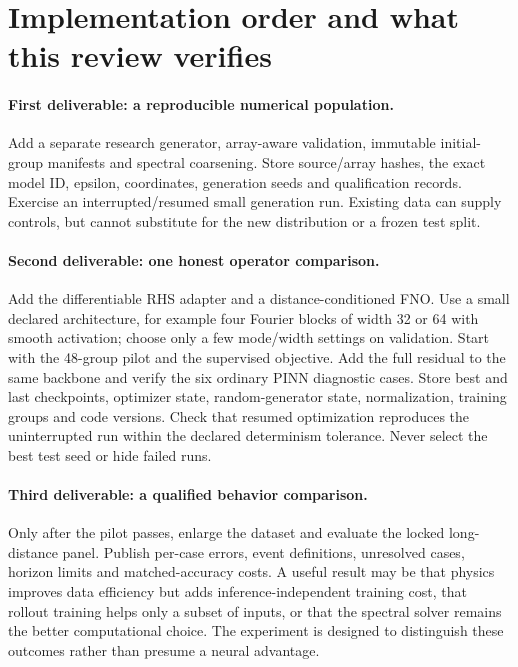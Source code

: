 \section{Implementation order and what this review verifies}
\label{sec:implementation}

\paragraph{First deliverable: a reproducible numerical population.}
Add a separate research generator, array-aware validation, immutable
initial-group manifests and spectral coarsening. Store source/array hashes,
the exact model ID, epsilon, coordinates, generation seeds and
qualification records. Exercise an interrupted/resumed small generation
run. Existing data can supply controls, but cannot substitute for the
new distribution or a frozen test split.

\paragraph{Second deliverable: one honest operator comparison.}
Add the differentiable RHS adapter and a distance-conditioned FNO.
Use a small declared architecture, for example four Fourier blocks of
width 32 or 64 with smooth activation; choose only a few mode/width
settings on validation. Start with the 48-group pilot and the
supervised objective. Add the full residual to the same backbone and
verify the six ordinary PINN diagnostic cases. Store best and last
checkpoints, optimizer state, random-generator state, normalization,
training groups and code versions. Check that resumed optimization
reproduces the uninterrupted run within the declared determinism
tolerance. Never select the best test seed or hide failed runs.

\paragraph{Third deliverable: a qualified behavior comparison.}
Only after the pilot passes, enlarge the dataset and evaluate the
locked long-distance panel. Publish per-case errors, event definitions,
unresolved cases, horizon limits and matched-accuracy costs.
A useful result may be that physics improves data efficiency but adds
inference-independent training cost, that rollout training helps only
a subset of inputs, or that the spectral solver remains the better
computational choice. The experiment is designed to distinguish these
outcomes rather than presume a neural advantage.


